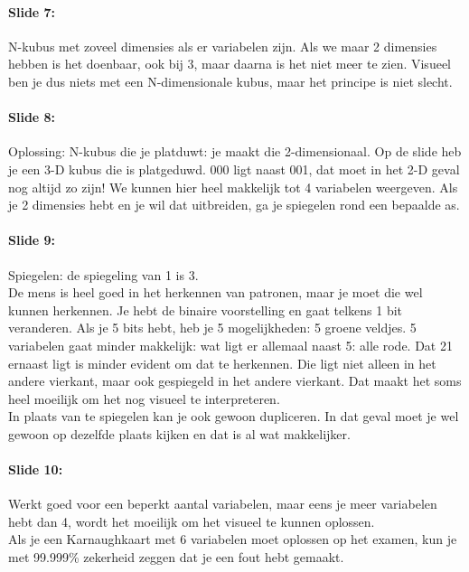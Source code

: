 \documentclass[10pt,a4paper]{book}
\begin{document}
\paragraph{Slide 7:} N-kubus met zoveel dimensies als er variabelen zijn. Als we maar 2 dimensies hebben is het doenbaar, ook bij 3, maar daarna is het niet meer te zien. Visueel ben je dus niets met een N-dimensionale kubus, maar het principe is niet slecht. 

\paragraph{Slide 8:} Oplossing: N-kubus die je platduwt: je maakt die 2-dimensionaal. Op de slide heb je een 3-D kubus die is platgeduwd. 000 ligt naast 001, dat moet in het 2-D geval nog altijd zo zijn! We kunnen hier heel makkelijk tot 4 variabelen weergeven. Als je 2 dimensies hebt en je wil dat uitbreiden, ga je spiegelen rond een bepaalde as.

\paragraph{Slide 9:} Spiegelen: de spiegeling van 1 is 3. \\
De mens is heel goed in het herkennen van patronen, maar je moet die wel kunnen herkennen. Je hebt de binaire voorstelling en gaat telkens 1 bit veranderen. Als je 5 bits hebt, heb je 5 mogelijkheden: 5 groene veldjes. 5 variabelen gaat minder makkelijk: wat ligt er allemaal naast 5: alle rode. Dat 21 ernaast ligt is minder evident om dat te herkennen. Die ligt niet alleen in het andere vierkant, maar ook gespiegeld in het andere vierkant. Dat maakt het soms heel moeilijk om het nog visueel te interpreteren.\\
In plaats van te spiegelen kan je ook gewoon dupliceren. In dat geval moet je wel gewoon op dezelfde plaats kijken en dat is al wat makkelijker. 

\paragraph{Slide 10:} Werkt goed voor een beperkt aantal variabelen, maar eens je meer variabelen hebt dan 4, wordt het moeilijk om het visueel te kunnen oplossen. \\
Als je een Karnaughkaart met 6 variabelen moet oplossen op het examen, kun je met 99.999\% zekerheid zeggen dat je een fout hebt gemaakt.
\end{document}

